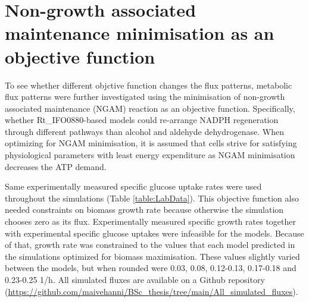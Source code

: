 

\section{Non-growth associated maintenance minimisation as an objective function}

To see whether different objctive function changes the flux patterns, metabolic flux patterns were further investigated using the minimisation of non-growth associated maintenance (NGAM) reaction as an objective function. 
Specifically, whether Rt\_IFO0880-based models could re-arrange NADPH regeneration through different pathways than alcohol and aldehyde dehydrogenase. When optimizing for NGAM minimisation, it is assumed that cells strive for satisfying physiological parameters with least energy expenditure as NGAM minimisation decreases the ATP demand.

Same experimentally measured specific glucose uptake rates were used throughout the simulations (Table \ref{table:LabData}). This objective function also needed constraints on biomass growth rate because otherwise the simulation chooses zero as its flux. Experimentally measured specific growth rates together with experimental specific glucose uptakes were infeasible for the models. Because of that, growth rate was constrained to the values that each model predicted in the simulations optimized for biomass maximisation. These values slightly varied between the models, but when rounded were 0.03, 0.08, 0.12-0.13, 0.17-0.18 and 0.23-0.25 \unit{1/h}. All simulated fluxes are available on a Github repository (\url{https://github.com/maivehanni/BSc_thesis/tree/main/All_simulated_fluxes}). 





